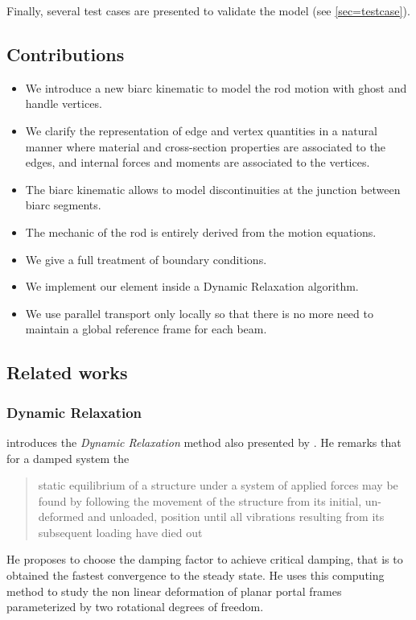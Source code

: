 Finally, several test cases are presented to validate the model (see \cref{sec=testcase}).

\subsection{Contributions}
\begin{itemize}
	\item We introduce a new  biarc kinematic to model the rod motion with ghost and handle vertices.
	\item We clarify the representation of edge and vertex quantities in a natural manner where material and cross-section properties are associated to the edges, and internal forces and moments are associated to the vertices.
	\item The biarc kinematic allows to model discontinuities at the junction between biarc segments.
	\item The mechanic of the rod is entirely derived from the motion equations.
	\item We give a full treatment of boundary conditions.
	\item We implement our element inside a Dynamic Relaxation algorithm.
	\item We use parallel transport only locally so that there is no more need to maintain a global reference frame for each beam.
\end{itemize}

\subsection{Related works}

\subsubsection{Dynamic Relaxation}

 introduces the \emph{Dynamic Relaxation} method also presented by . He remarks that for a damped system the \blockquote{static equilibrium of a structure under a system of applied forces may be found by following the movement of the structure from its initial, un-deformed and unloaded, position until all vibrations resulting from its subsequent loading have died out}. He proposes to choose the damping factor to achieve critical damping, that is to obtained the fastest convergence to the steady state. He uses this computing method to study the non linear deformation of planar portal frames parameterized by two rotational degrees of freedom.

